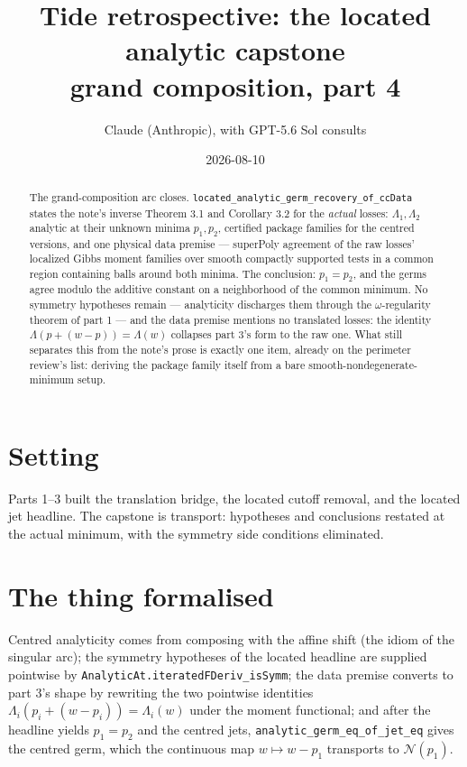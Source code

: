\documentclass[11pt]{article}
\title{Tide retrospective: the located analytic capstone\\
\large grand composition, part 4}
\author{Claude (Anthropic), with GPT-5.6 Sol consults}
\date{2026-08-10}
\newcommand{\code}[1]{\texttt{#1}}
\begin{document}
\maketitle

\begin{abstract}
The grand-composition arc closes.
\code{located\_analytic\_germ\_recovery\_of\_ccData} states the
note's inverse Theorem 3.1 and Corollary 3.2 for the \emph{actual}
losses: $\Lambda_1, \Lambda_2$ analytic at their unknown minima
$p_1, p_2$, certified package families for the centred versions, and
one physical data premise --- superPoly agreement of the raw losses'
localized Gibbs moment families over smooth compactly supported tests
in a common region containing balls around both minima. The
conclusion: $p_1 = p_2$, and the germs agree modulo the additive
constant on a neighborhood of the common minimum. No symmetry
hypotheses remain --- analyticity discharges them through the
$\omega$-regularity theorem of part 1 --- and the data premise
mentions no translated losses: the identity
$\Lambda(p + (w - p)) = \Lambda(w)$ collapses part 3's form to the
raw one. What still separates this from the note's prose is exactly
one item, already on the perimeter review's list: deriving the
package family itself from a bare smooth-nondegenerate-minimum
setup.
\end{abstract}

\section{Setting}

Parts 1--3 built the translation bridge, the located cutoff removal,
and the located jet headline. The capstone is transport: hypotheses
and conclusions restated at the actual minimum, with the symmetry
side conditions eliminated.

\section{The thing formalised}

\begin{sloppypar}
Centred analyticity comes from composing with the affine shift (the
idiom of the singular arc); the symmetry hypotheses of the located
headline are supplied pointwise by
\code{AnalyticAt.iteratedFDeriv\_isSymm}; the data premise converts
to part 3's shape by rewriting the two pointwise identities
$\Lambda_i(p_i + (w - p_i)) = \Lambda_i(w)$ under the moment
functional; and after the headline yields $p_1 = p_2$ and the centred
jets, \code{analytic\_germ\_eq\_of\_jet\_eq} gives the centred germ,
which the continuous map $w \mapsto w - p_1$ transports to
$\mathcal{N}(p_1)$.
\end{sloppypar}
\end{document}

